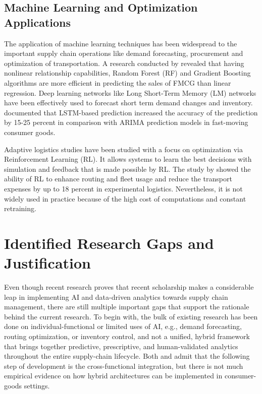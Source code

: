 \subsection{Machine Learning and Optimization Applications}

The application of machine learning techniques has been widespread to the important supply chain operations like demand forecasting, procurement and optimization of transportation. A research conducted by \autocite{thejovathi_evaluating_nodate, kang_sales_2023} revealed that having nonlinear relationship capabilities, Random Forest (RF) and Gradient Boosting algorithms are more efficient in predicting the sales of FMCG than linear regression. Deep learning networks like Long Short-Term Memory (LM) networks have been effectively used to forecast short term demand changes and inventory. \autocite{yu2023} documented that LSTM-based prediction increased the accuracy of the prediction by 15-25 percent in comparison with ARIMA prediction models in fast-moving consumer goods.

Adaptive logistics studies have been studied with a focus on optimization via Reinforcement Learning (RL). It allows systems to learn the best decisions with simulation and feedback that is made possible by RL. The study by \autocite{chowdhury2025systematic} showed the ability of RL to enhance routing and fleet usage and reduce the transport expenses by up to 18 percent in experimental logistics. Nevertheless, it is not widely used in practice because of the high cost of computations and constant retraining.


\section{Identified Research Gaps and Justification}

Even though recent research proves that recent scholarship makes a considerable leap in implementing AI and data-driven analytics towards supply chain management, there are still multiple important gaps that support the rationale behind the current research. To begin with, the bulk of existing research has been done on individual-functional or limited uses of AI, e.g., demand forecasting, routing optimization, or inventory control, and not a unified, hybrid framework that brings together predictive, prescriptive, and human-validated analytics throughout the entire supply-chain lifecycle. Both \autocite{ivanov_digital_2025} and \autocite{Wamba2022AIenabled} admit that the following step of development is the cross-functional integration, but there is not much empirical evidence on how hybrid architectures can be implemented in consumer-goods settings.

